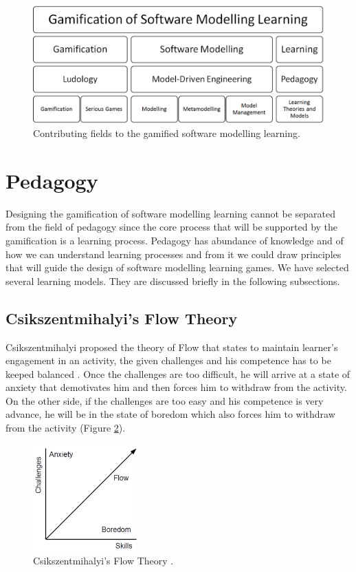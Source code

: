 \documentclass[12pt, a4paper]{report}
\begin{document}
\begin{figure}[ht]
\centering
\includegraphics[width=12cm]{smlg2}
\caption{Contributing fields to the gamified software modelling learning.}
\label{smlg2}
\end{figure}

\section{Pedagogy}
\label{Pedagogy}
Designing the gamification of software modelling learning cannot be separated from the field of pedagogy since the core process that will be supported by the gamification is a learning process. Pedagogy has abundance of knowledge and of how we can understand learning processes and from it we could draw principles that will guide the design of software modelling learning games. We have selected several learning models. They are discussed briefly in the following subsections.

\subsection{Csikszentmihalyi's Flow Theory}
Csikszentmihalyi proposed the theory of Flow that states to maintain learner's engagement in an activity, the given challenges and his competence has to be keeped balanced \cite{csikszentmihalyi2014toward}. Once the challenges are too difficult, he will arrive at a state of anxiety that demotivates him and then forces him to withdraw from the activity. On the other side, if the challenges are too easy and his competence is very advance, he will be in the state of boredom which also forces him to withdraw from the activity (Figure \ref{flow-theory}).

\begin{figure}[ht]
\centering
\includegraphics[width=4cm]{flow-theory}
\caption{Csikszentmihalyi's Flow Theory \cite{csikszentmihalyi2014toward}.}
\label{flow-theory}
\end{figure}
    
\end{document}
